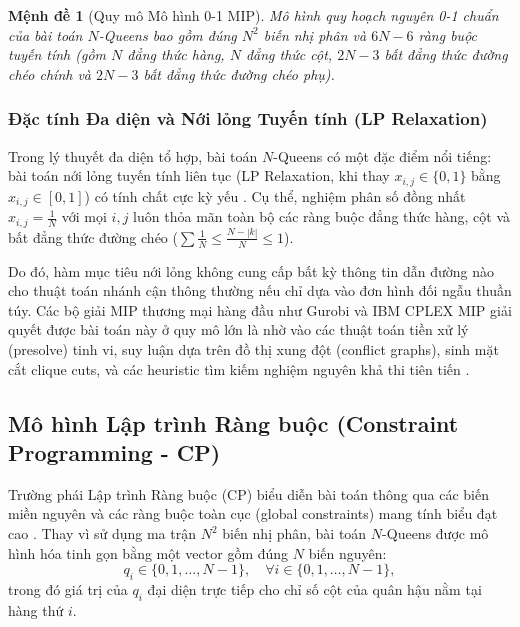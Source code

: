 \documentclass[a4paper,fleqn]{cas-sc}
\newtheorem{proposition}{Mệnh đề}
\begin{document}
\begin{proposition}[Quy mô Mô hình 0-1 MIP]
Mô hình quy hoạch nguyên 0-1 chuẩn của bài toán $N$-Queens bao gồm đúng $N^2$ biến nhị phân và $6N - 6$ ràng buộc tuyến tính (gồm $N$ đẳng thức hàng, $N$ đẳng thức cột, $2N - 3$ bất đẳng thức đường chéo chính và $2N - 3$ bất đẳng thức đường chéo phụ).
\end{proposition}

\subsubsection{Đặc tính Đa diện và Nới lỏng Tuyến tính (LP Relaxation)}
Trong lý thuyết đa diện tổ hợp, bài toán $N$-Queens có một đặc điểm nổi tiếng: bài toán nới lỏng tuyến tính liên tục (LP Relaxation, khi thay $x_{i,j} \in \{0, 1\}$ bằng $x_{i,j} \in [0, 1]$) có tính chất cực kỳ yếu \cite{wolsey1999integer}. Cụ thể, nghiệm phân số đồng nhất $x_{i,j} = \frac{1}{N}$ với mọi $i, j$ luôn thỏa mãn toàn bộ các ràng buộc đẳng thức hàng, cột và bất đẳng thức đường chéo ($\sum \frac{1}{N} \le \frac{N-|k|}{N} \le 1$). 

Do đó, hàm mục tiêu nới lỏng không cung cấp bất kỳ thông tin dẫn đường nào cho thuật toán nhánh cận thông thường nếu chỉ dựa vào đơn hình đối ngẫu thuần túy. Các bộ giải MIP thương mại hàng đầu như Gurobi và IBM CPLEX MIP giải quyết được bài toán này ở quy mô lớn là nhờ vào các thuật toán tiền xử lý (presolve) tinh vi, suy luận dựa trên đồ thị xung đột (conflict graphs), sinh mặt cắt clique cuts, và các heuristic tìm kiếm nghiệm nguyên khả thi tiên tiến \cite{bixby2002solving,achterberg2013gurobi}.

\subsection{Mô hình Lập trình Ràng buộc (Constraint Programming - CP)}
Trường phái Lập trình Ràng buộc (CP) biểu diễn bài toán thông qua các biến miền nguyên và các ràng buộc toàn cục (global constraints) mang tính biểu đạt cao \cite{rossi2006handbook}. Thay vì sử dụng ma trận $N^2$ biến nhị phân, bài toán $N$-Queens được mô hình hóa tinh gọn bằng một vector gồm đúng $N$ biến nguyên:
\begin{equation}
    q_i \in \{0, 1, \dots, N-1\}, \quad \forall i \in \{0, 1, \dots, N-1\},
\end{equation}
trong đó giá trị của $q_i$ đại diện trực tiếp cho chỉ số cột của quân hậu nằm tại hàng thứ $i$.
\end{document}
